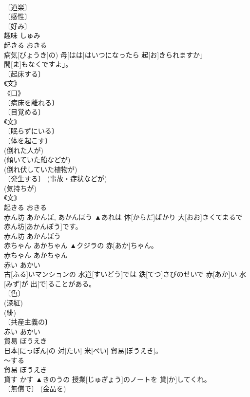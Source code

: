 \documentclass[8pt]{extreport}
\begin{document}
\begin{CJK}{UTF8}{min}
\\	〔道楽〕 
\\	〔感性〕 
\\	〔好み〕 
\\	趣味	しゅみ	
\\	起きる	おきる	
\\	病気[びょうき]の) 母[はは]はいつになったら 起[お]きられますか」
\\	間[ま]もなくですよ」。	
\\	〔起床する〕 
\\	《文》 
\\	《口》 
\\	〔病床を離れる〕 
\\	〔目覚める〕 
\\	《文》 
\\	〔眠らずにいる〕 
\\	〔体を起こす〕 
\\	(倒れた人が) 
\\	(傾いていた船などが) 
\\	(倒れ伏していた植物が) 
\\	〔発生する〕 (事故・症状などが) 
\\	(気持ちが) 
\\	《文》 
\\	起きる	おきる	
\\	赤ん坊	あかんぼ, あかんぼう	▲あれは 体[からだ]ばかり 大[おお]きくてまるで 赤ん坊[あかんぼう]です。	
\\	[⇒あかちゃん]	赤ん坊	あかんぼう	
\\	赤ちゃん	あかちゃん	▲クジラの 赤[あか]ちゃん。	
\\	赤ちゃん	あかちゃん	
\\	赤い	あかい	
\\	古[ふる]いマンションの 水道[すいどう]では 鉄[てつ]さびのせいで 赤[あか]い 水[みず]が 出[で]ることがある。	
\\	〔色〕 
\\	(深紅) 
\\	(緋) 
\\	〔共産主義の〕 
\\	赤い	あかい	
\\	貿易	ぼうえき	
\\	日本[にっぽん]の 対[たい] 米[べい] 貿易[ぼうえき]。	
\\	～する 
\\	貿易	ぼうえき	
\\	貸す	かす	▲きのうの 授業[じゅぎょう]のノートを 貸[か]してくれ。	
\\	〔無償で〕 (金品を) 

\end{CJK}
\end{document}
